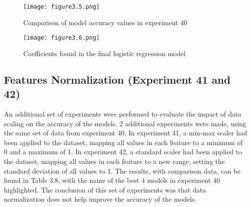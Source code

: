 \documentclass{report}
\begin{document}
\begin{figure}[h!]
\centering
\texttt{[image: figure3.5.png]}
\caption{Comparison of model accuracy values in experiment 40}
\end{figure}

\begin{figure}[h!]
\centering
\texttt{[image: figure3.6.png]}
\caption{Coefficients found in the final logistic regression model}
\end{figure}

\subsection{Features Normalization (Experiment 41 and 42)}

An additional set of experiments were performed to evaluate the impact of data scaling on the accuracy of the models. 2 additional experiments were made, using the same set of data from experiment 40. In experiment 41, a min-max scaler had been applied to the dataset, mapping all values in each feature to a minimum of 0 and a maximum of 1. In experiment 42, a standard scaler had been applied to the dataset, mapping all values in each feature to a new range, setting the standard deviation of all values to 1. The results, with comparison data, can be found in Table 3.8, with the name of the best 4 models in experiment 40 highlighted. The conclusion of this set of experiments was that data normalization does not help improve the accuracy of the models.
\end{document}
